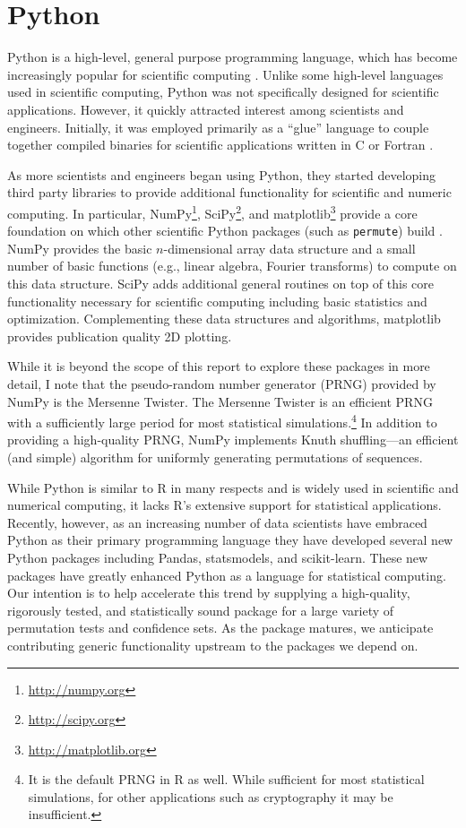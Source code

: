 \section{Python}

Python is a high-level, general purpose programming language, which has become
increasingly popular for scientific computing \cite{millman2011python,
Perez2011}. Unlike some high-level languages used in scientific computing,
Python was not specifically designed for scientific applications.  However, it
quickly attracted interest among scientists and engineers.  Initially, it was
employed primarily as a ``glue'' language to couple together compiled binaries
for scientific applications written in C or Fortran \cite{dubois2007guest}.

As more scientists and engineers began using Python, they started developing
third party libraries to provide additional functionality for scientific and
numeric computing.  In particular, NumPy\footnote{\url{http://numpy.org}},
SciPy\footnote{\url{http://scipy.org}}, and
matplotlib\footnote{\url{http://matplotlib.org}} provide a core foundation on
which other scientific Python packages (such as \texttt{permute}) build 
\cite{oliphant2007python, van2011numpy, hunter2007matplotlib}. NumPy
provides the basic $n$-dimensional array data structure and a small number of
basic functions (e.g., linear algebra, Fourier transforms) to compute on this data
structure.  SciPy adds additional general routines on top of this core
functionality necessary for scientific computing including basic statistics and
optimization.  Complementing these data structures and algorithms, matplotlib
provides publication quality 2D plotting.  

While it is beyond the scope of this report to explore these packages in more
detail, I note that the pseudo-random number generator (PRNG) provided by NumPy
is the Mersenne Twister.  The Mersenne Twister is an efficient PRNG with a
sufficiently large period for most statistical simulations.\footnote{It is the
default PRNG in R as well.  While sufficient for most statistical simulations,
for other applications such as cryptography it may be insufficient.}  In
addition to providing a high-quality PRNG, NumPy implements Knuth
shuffling---an efficient (and simple) algorithm for uniformly generating
permutations of sequences.

While Python is similar to R in many respects and is widely used in scientific
and numerical computing, it lacks R's extensive support for statistical
applications.  Recently, however, as an increasing number of data scientists
have embraced Python as their primary programming language they have developed
several new Python packages including Pandas, statsmodels, and
scikit-learn.  These new packages have greatly enhanced Python as a language for
statistical computing.  Our intention is to help accelerate this trend by supplying a
high-quality, rigorously tested, and statistically sound package for a large
variety of permutation tests and confidence sets. As the package matures, we
anticipate contributing generic functionality upstream to the packages we
depend on.

